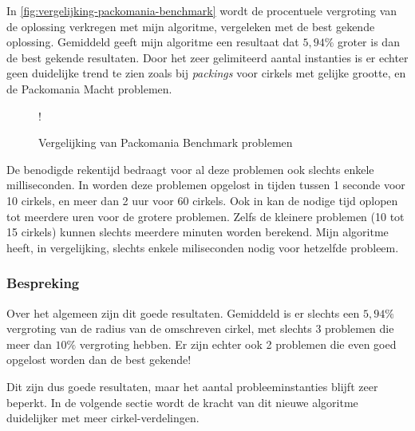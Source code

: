 \documentclass[12pt,a4paper,oneside]{book}
\begin{document}
{In \autoref{fig:vergelijking-packomania-benchmark} wordt de procentuele vergroting van de oplossing verkregen met mijn algoritme, vergeleken met de best gekende oplossing.
Gemiddeld geeft mijn algoritme een resultaat dat $5,94\%$ groter is dan de best gekende resultaten.
Door het zeer gelimiteerd aantal instanties is er echter geen duidelijke trend te zien zoals bij \textit{packings} voor cirkels met gelijke grootte, en de Packomania Macht problemen.

\begin {figure}
	\centering
	 {!} {
	}
	\caption{Vergelijking van Packomania Benchmark problemen}
	\label{fig:vergelijking-packomania-benchmark}
\end {figure}

De benodigde rekentijd bedraagt voor al deze problemen ook slechts enkele milliseconden.
In \cite{ye2013iterated} worden deze problemen opgelost in tijden tussen 1 seconde voor 10 cirkels, en meer dan 2 uur voor 60 cirkels.
Ook in \cite{huang2013tabu} kan de nodige tijd oplopen tot meerdere uren voor de grotere problemen.
Zelfs de kleinere problemen (10 tot 15 cirkels) kunnen slechts meerdere minuten worden berekend.
Mijn algoritme heeft, in vergelijking, slechts enkele miliseconden nodig voor hetzelfde probleem.

\subsubsection{Bespreking}

Over het algemeen zijn dit goede resultaten.
Gemiddeld is er slechts een $5,94\%$ vergroting van de radius van de omschreven cirkel, met slechts 3 problemen die meer dan $10\%$ vergroting hebben.
Er zijn echter ook 2 problemen die even goed opgelost worden dan de best gekende!

Dit zijn dus goede resultaten, maar het aantal probleeminstanties blijft zeer beperkt.
In de volgende sectie wordt de kracht van dit nieuwe algoritme duidelijker met meer cirkel-verdelingen.

}
\end{document}
